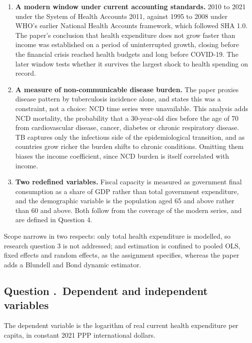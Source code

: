 \documentclass[11pt,a4paper]{article}
\newcounter{qnum}
\newcommand{\question}[1]{\subsection*{Question \stepcounter{qnum}\theqnum.\ #1}}
\begin{document}
\begin{enumerate}
  \item \textbf{A modern window under current accounting standards.} 2010 to
        2021 under the System of Health Accounts 2011, against 1995 to 2008 under
        WHO's earlier National Health Accounts framework, which followed SHA 1.0.
        The paper's conclusion that health expenditure does not grow faster than
        income was established on a period of uninterrupted growth, closing
        before the financial crisis reached health budgets and long before
        COVID-19. The later window tests whether it survives the largest shock to
        health spending on record.

  \item \textbf{A measure of non-communicable disease burden.} The paper proxies
        disease pattern by tuberculosis incidence alone, and states this was a
        constraint, not a choice: NCD time series were unavailable. This
        analysis adds NCD mortality, the probability that a 30-year-old dies
        before the age of 70 from cardiovascular disease, cancer, diabetes or
        chronic respiratory disease. TB captures only the infectious side of the
        epidemiological transition, and as countries grow richer the burden
        shifts to chronic conditions. Omitting them biases the income
        coefficient, since NCD burden is itself correlated with income.

  \item \textbf{Two redefined variables.} Fiscal capacity is measured as
        government final consumption as a share of GDP rather than total
        government expenditure, and the demographic variable is the population
        aged 65 and above rather than 60 and above. Both follow from the coverage
        of the modern series, and are defined in Question 4.
\end{enumerate}

Scope narrows in two respects: only total health expenditure is modelled, so
research question 3 is not addressed; and estimation is confined to pooled OLS,
fixed effects and random effects, as the assignment specifies, whereas the paper
adds a Blundell and Bond dynamic estimator.

\question{Dependent and independent variables}

The dependent variable is the logarithm of real current health expenditure per
capita, in constant 2021 PPP international dollars.
\end{document}
